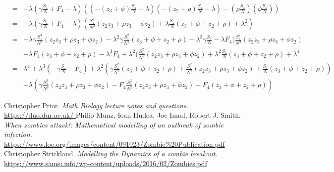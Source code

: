 \documentclass{mm2}
\numberwithin{equation}{section}
\theoremstyle{definition}
\begin{document}
\begin{eqnarray}
 &=& -\lambda (\gamma\frac{S_z}{N} + F_4 - \lambda)((- (z_3+ \phi)\frac{S_z}{N} -\lambda)(- (z_2 + \rho)\frac{S_z}{N} - \lambda)- (\rho \frac{S_z}{N})(\phi \frac{S_z}{N})) \nonumber \\
 &=& -\lambda (\gamma\frac{S_z}{N} + F_4 - \lambda)(\frac{S_z^2}{N^2}(z_2z_3 + \rho z_3 + \phi z_2) + \lambda \frac{S_z}{N}(z_3 + \phi + z_2 + \rho) + \lambda ^ 2) \nonumber \\
 &=& -\lambda \gamma \frac{S_z ^ 3}{N^3}(z_2z_3 + \rho z_3 + \phi z_2) -\lambda ^2 \gamma \frac{S_z ^ 2}{N^2}(z_3 + \phi + z_2 + \rho) -\lambda ^3 \gamma \frac{S_z}{N} -\lambda F_4(\frac{S_z^2}{N^2}(z_2z_3 + \rho z_3 + \phi z_2)\nonumber\\&& - \lambda F_4(z_3 + \phi + z_2 + \rho) - \lambda^3 F_4  + \lambda ^2(\frac{S_z^2}{N^2}(z_2z_3 + \rho z_3 + \phi z_2) + \lambda^2 \frac{S_z}{N}(z_3 + \phi + z_2 + \rho) + \lambda ^ 4 \nonumber \\
 &=& \lambda ^ 4 + \lambda ^ 3(-\gamma \frac{S_z}{N} - F_4) + \lambda ^2(\gamma \frac{S_z ^ 2}{N^2}(z_3 + \phi + z_2 + \rho)+ \frac{S_z^2}{N^2}(z_2z_3 + \rho z_3 + \phi z_2)+ \frac{S_z}{N}(z_3 + \phi + z_2 + \rho))  \nonumber \\ &&  + \lambda(\gamma \frac{S_z ^ 3}{N^3}(z_2z_3 + \rho z_3 + \phi z_2)- F_4\frac{S_z^2}{N^2}(z_2z_3 + \rho z_3 + \phi z_2)- F_4(z_3 + \phi + z_2 + \rho) )
\end{eqnarray}
\begin{thebibliography}{99}
	Christopher Prior. {\it  Math Biology lecture notes and questions.} \url{https://duo.dur.ac.uk/ }
	Philip Munz, Ioan Hudea, Joe Imad, Robert J. Smith. {\it  When zombies attack!:  Mathematical modelling of an outbreak of zombie infection.} \url{https://www.loe.org/images/content/091023/Zombie%20Publication.pdf}
	Christopher Strickland. {\it Modelling the Dynamics of a zombie breakout.} \url{https://www.samsi.info/wp-content/uploads/2016/02/Zombies.pdf}
\end{thebibliography}
\end{document}
